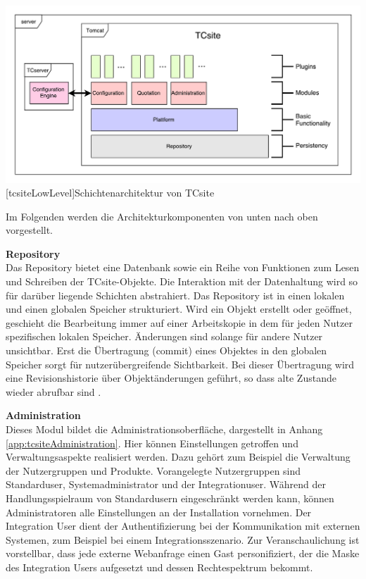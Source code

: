 \documentclass[12pt,a4paper,bibliography=totocnumbered,listof=totoc]{scrartcl}
\begin{document}
\vspace{1em}
\begin{minipage}{\linewidth}
	\centering
	\includegraphics[width=1\linewidth]{Abbildungen/tcsiteLowLevel.pdf}
	[tcsiteLowLevel]{Schichtenarchitektur von TCsite}
	\label{fig:tcsiteLowLevel}
\end{minipage}
\vspace{1em}

Im Folgenden werden die Architekturkomponenten von unten nach oben vorgestellt.

\textbf{Repository}\\
Das Repository bietet eine Datenbank sowie ein Reihe von Funktionen zum Lesen und Schreiben der TCsite-Objekte. Die Interaktion mit der Datenhaltung wird so für darüber liegende Schichten abstrahiert. Das Repository ist in einen lokalen und einen globalen Speicher strukturiert. Wird ein Objekt erstellt oder geöffnet, geschieht die Bearbeitung immer auf einer Arbeitskopie in dem für jeden Nutzer spezifischen lokalen Speicher. Änderungen sind solange für andere Nutzer unsichtbar. Erst die Übertragung (commit) eines Objektes in den globalen Speicher sorgt für nutzerübergreifende Sichtbarkeit. Bei dieser Übertragung wird eine Revisionshistorie über Objektänderungen geführt, so dass alte Zustande wieder abrufbar sind \citep{tactonTCsiteDevelopmentManual}.

\textbf{Administration}\\
Dieses Modul bildet die Administrationsoberfläche, dargestellt in Anhang \ref{app:tcsiteAdministration}. Hier können Einstellungen getroffen und Verwaltungsaspekte realisiert werden. Dazu gehört zum Beispiel die Verwaltung der Nutzergruppen und Produkte. Vorangelegte Nutzergruppen sind Standarduser, Systemadministrator und der Integrationuser. Während der Handlungsspielraum von Standardusern eingeschränkt werden kann, können Administratoren alle Einstellungen an der Installation vornehmen. Der Integration User dient der Authentifizierung bei der Kommunikation mit externen Systemen, zum Beispiel bei einem Integrationsszenario. Zur Veranschaulichung ist vorstellbar, dass jede externe Webanfrage einen Gast personifiziert, der die Maske des Integration Users aufgesetzt und dessen Rechtespektrum bekommt.
\end{document}
